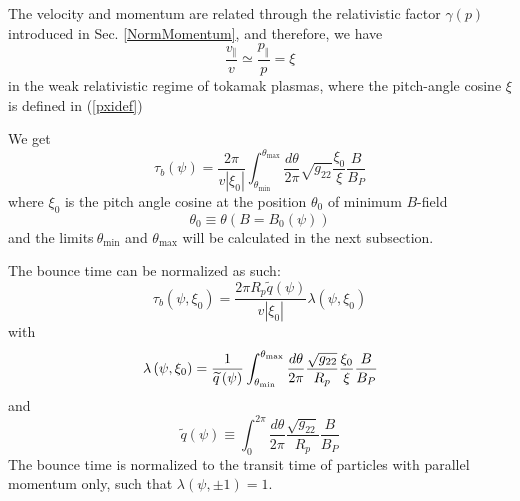 The velocity and momentum are related through the relativistic factor $%
\gamma \left( p\right) $ introduced in Sec. \ref{NormMomentum}, and
therefore, we have 
\begin{equation}
\frac{v_{\Vert }}{v}\simeq \frac{p_{\Vert }}{p}=\xi
\end{equation}
 in the weak relativistic
regime of tokamak plasmas, where the pitch-angle cosine $\xi $ is defined in
(\ref{pxidef})

We get 
\begin{equation}
\tau _{b}\left( \psi \right) =\frac{2\pi }{v\left| \xi _{0}\right| }%
\int_{\theta _{\min }}^{\theta _{\max }}\frac{d\theta }{2\pi }\sqrt{g_{22}}%
\frac{\xi _{0}}{\xi }\frac{B}{B_{P}}
\end{equation}
 where $\xi _{0}$ is the pitch angle cosine at the
position $\theta _{0}$ of minimum $B$-field 
\begin{equation}
\theta _{0}\equiv \theta \left( B=B_{0}\left( \psi \right) \right)
\label{theta0ref}
\end{equation}
and the limits$\ \theta _{\min }$ and $\theta _{\max }$ will be calculated
in the next subsection. 

The bounce time can be normalized as such: 
\begin{equation}
\tau_{b}\left( \psi,\xi_{0}\right) =\frac{2\pi R_{p}\widetilde{q}\left(
\psi\right) }{v\left| \xi_{0}\right| }\lambda\left( \psi,\xi_{0}\right)
\label{Normbtime}
\end{equation}
with 
\begin{equation}
\lambda\left( \psi,\xi_{0}\right) =\frac{1}{\widetilde{q}\left( \psi\right) }%
\int_{\theta_{\min}}^{\theta_{\max}}\frac{d\theta}{2\pi}\frac{\sqrt{g_{22}}}{%
R_{p}}\frac{\xi_{0}}{\xi}\frac{B}{B_{P}}  \label{lambda0}
\end{equation}
and 
\begin{equation}
\widetilde{q}\left( \psi\right) \equiv\int_{0}^{2\pi}\frac{d\theta}{2\pi }%
\frac{\sqrt{g_{22}}}{R_{p}}\frac{B}{B_{P}}
\end{equation}
 The bounce time is normalized to the
transit time of particles with parallel momentum only, such that $%
\lambda\left( \psi,\pm1\right) =1$.

